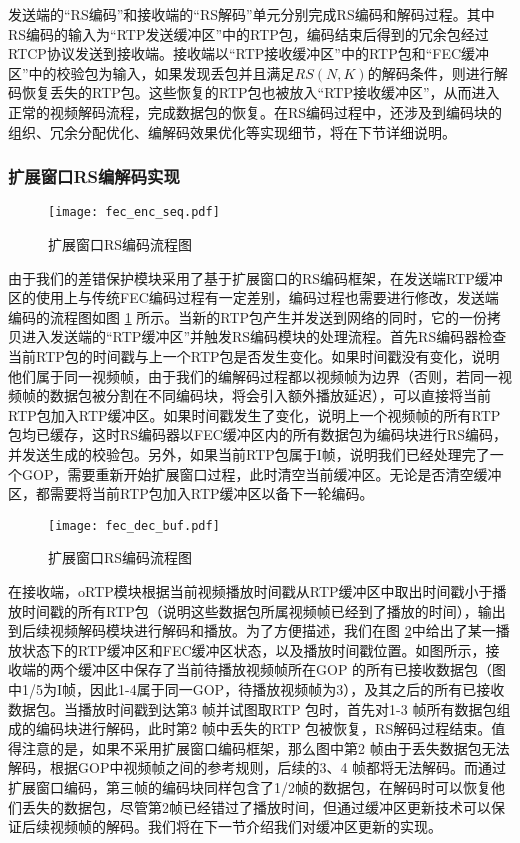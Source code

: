     发送端的``RS编码''和接收端的``RS解码''单元分别完成RS编码和解码过程。其中RS编码的输入为``RTP发送缓冲区''中的RTP包，编码结束后得到的冗余包经过RTCP协议发送到接收端。接收端以``RTP接收缓冲区''中的RTP包和``FEC缓冲区''中的校验包为输入，如果发现丢包并且满足$RS(N,K)$的解码条件，则进行解码恢复丢失的RTP包。这些恢复的RTP包也被放入``RTP接收缓冲区''，从而进入正常的视频解码流程，完成数据包的恢复。在RS编码过程中，还涉及到编码块的组织、冗余分配优化、编解码效果优化等实现细节，将在下节详细说明。

    \subsubsection{扩展窗口RS编解码实现}
    \begin{figure}[htbp]
      \centering
      \texttt{[image: fec\_enc\_seq.pdf]}
      \caption{扩展窗口RS编码流程图}
      \label{fig:fec_enc_seq}
    \end{figure}

    由于我们的差错保护模块采用了基于扩展窗口的RS编码框架，在发送端RTP缓冲区的使用上与传统FEC编码过程有一定差别，编码过程也需要进行修改，发送端编码的流程图如图 \ref{fig:fec_enc_seq} 所示。当新的RTP包产生并发送到网络的同时，它的一份拷贝进入发送端的``RTP缓冲区''并触发RS编码模块的处理流程。首先RS编码器检查当前RTP包的时间戳与上一个RTP包是否发生变化。如果时间戳没有变化，说明他们属于同一视频帧，由于我们的编解码过程都以视频帧为边界（否则，若同一视频帧的数据包被分割在不同编码块，将会引入额外播放延迟），可以直接将当前RTP包加入RTP缓冲区。如果时间戳发生了变化，说明上一个视频帧的所有RTP包均已缓存，这时RS编码器以FEC缓冲区内的所有数据包为编码块进行RS编码，并发送生成的校验包。另外，如果当前RTP包属于I帧，说明我们已经处理完了一个GOP，需要重新开始扩展窗口过程，此时清空当前缓冲区。无论是否清空缓冲区，都需要将当前RTP包加入RTP缓冲区以备下一轮编码。

    \begin{figure}[htbp]
      \centering
      \texttt{[image: fec\_dec\_buf.pdf]}
      \caption{扩展窗口RS编码流程图}
      \label{fig:fec_dec_buf}
    \end{figure}

    在接收端，oRTP模块根据当前视频播放时间戳从RTP缓冲区中取出时间戳小于播放时间戳的所有RTP包（说明这些数据包所属视频帧已经到了播放的时间），输出到后续视频解码模块进行解码和播放。为了方便描述，我们在图 \ref{fig:fec_dec_buf}中给出了某一播放状态下的RTP缓冲区和FEC缓冲区状态，以及播放时间戳位置。如图所示，接收端的两个缓冲区中保存了当前待播放视频帧所在GOP 的所有已接收数据包（图中1/5为I帧，因此1-4属于同一GOP，待播放视频帧为3），及其之后的所有已接收数据包。当播放时间戳到达第3 帧并试图取RTP 包时，首先对1-3 帧所有数据包组成的编码块进行解码，此时第2 帧中丢失的RTP 包被恢复，RS解码过程结束。值得注意的是，如果不采用扩展窗口编码框架，那么图中第2 帧由于丢失数据包无法解码，根据GOP中视频帧之间的参考规则，后续的3、4 帧都将无法解码。而通过扩展窗口编码，第三帧的编码块同样包含了1/2帧的数据包，在解码时可以恢复他们丢失的数据包，尽管第2帧已经错过了播放时间，但通过缓冲区更新技术可以保证后续视频帧的解码。我们将在下一节介绍我们对缓冲区更新的实现。
    
